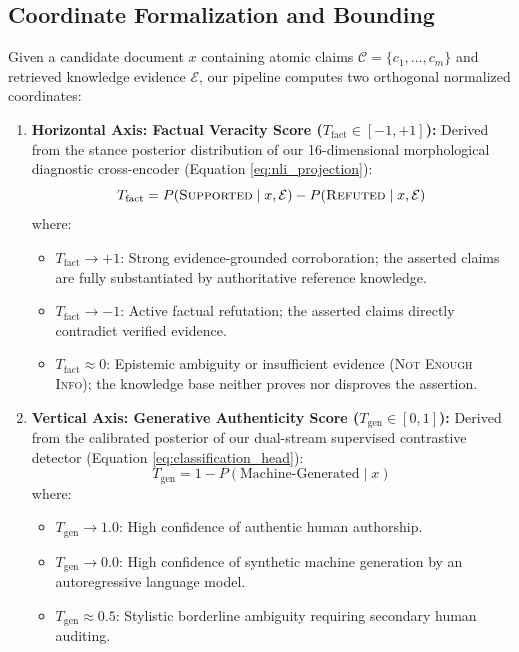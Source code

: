 \subsection{Coordinate Formalization and Bounding}
Given a candidate document $x$ containing atomic claims $\mathcal{C} = \{c_1, \dots, c_m\}$ and retrieved knowledge evidence $\mathcal{E}$, our pipeline computes two orthogonal normalized coordinates:
\begin{enumerate}
    \item \textbf{Horizontal Axis: Factual Veracity Score ($T_{\text{fact}} \in [-1, +1]$):}
    Derived from the stance posterior distribution of our 16-dimensional morphological diagnostic cross-encoder (Equation \eqref{eq:nli_projection}):
    \begin{equation}
        \label{eq:t_fact_def}
        T_{\text{fact}} = P(\textsc{Supported} \mid x, \mathcal{E}) - P(\textsc{Refuted} \mid x, \mathcal{E})
    \end{equation}
    where:
    \begin{itemize}
        \item $T_{\text{fact}} \to +1$: Strong evidence-grounded corroboration; the asserted claims are fully substantiated by authoritative reference knowledge.
        \item $T_{\text{fact}} \to -1$: Active factual refutation; the asserted claims directly contradict verified evidence.
        \item $T_{\text{fact}} \approx 0$: Epistemic ambiguity or insufficient evidence (\textsc{Not Enough Info}); the knowledge base neither proves nor disproves the assertion.
    \end{itemize}
    
    \item \textbf{Vertical Axis: Generative Authenticity Score ($T_{\text{gen}} \in [0, 1]$):}
    Derived from the calibrated posterior of our dual-stream supervised contrastive detector (Equation \eqref{eq:classification_head}):
    \begin{equation}
        \label{eq:t_gen_def}
        T_{\text{gen}} = 1 - P(\text{Machine-Generated} \mid x)
    \end{equation}
    where:
    \begin{itemize}
        \item $T_{\text{gen}} \to 1.0$: High confidence of authentic human authorship.
        \item $T_{\text{gen}} \to 0.0$: High confidence of synthetic machine generation by an autoregressive language model.
        \item $T_{\text{gen}} \approx 0.5$: Stylistic borderline ambiguity requiring secondary human auditing.
    \end{itemize}
\end{enumerate}

